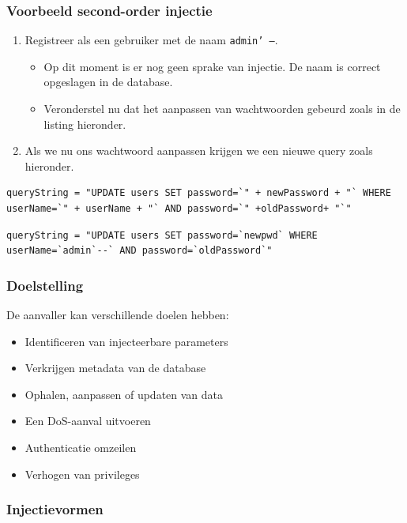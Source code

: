 \documentclass[../main.tex]{subfiles}
\begin{document}
\subsubsection{Voorbeeld second-order injectie}
\begin{enumerate}
	\item Registreer als een gebruiker met de naam \texttt{admin' --}.
	\begin{itemize}
		\item Op dit moment is er nog geen sprake van injectie. De naam is correct opgeslagen in de database.
		\item Veronderstel nu dat het aanpassen van wachtwoorden gebeurd zoals in de listing hieronder.
	\end{itemize}
	\item Als we nu ons wachtwoord aanpassen krijgen we een nieuwe query zoals hieronder.
\end{enumerate}
\begin{lstlisting}[caption=Updaten wachtwoord]
queryString = "UPDATE users SET password=`" + newPassword + "` WHERE userName=`" + userName + "` AND password=`" +oldPassword+ "`"
\end{lstlisting}
\begin{lstlisting}[caption=SQL Injection]
queryString = "UPDATE users SET password=`newpwd` WHERE userName=`admin`--` AND password=`oldPassword`"
\end{lstlisting}

\subsubsection{Doelstelling}
De aanvaller kan verschillende doelen hebben:
\begin{multicols}{2}
\begin{itemize}
	\item Identificeren van injecteerbare parameters
	\item Verkrijgen metadata van de database
	\item Ophalen, aanpassen of updaten van data
	\item Een DoS-aanval uitvoeren
	\item Authenticatie omzeilen
	\item Verhogen van privileges
\end{itemize}
\end{multicols}

\subsubsection{Injectievormen}
\end{document}
